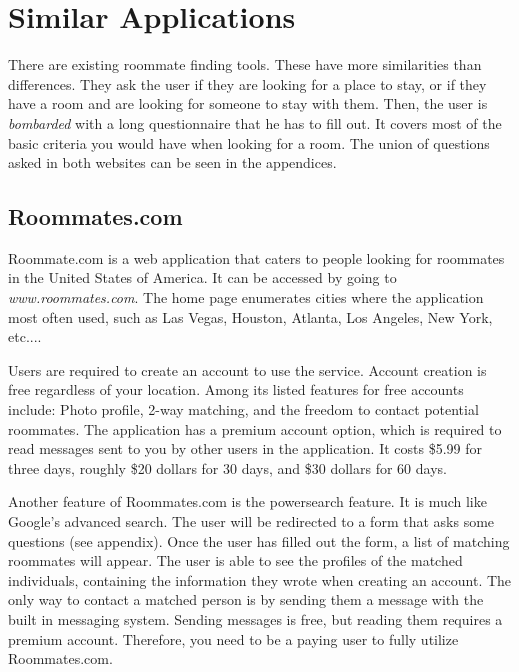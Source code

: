 \documentclass[journal]{./IEEE/IEEEtran}
\begin{document}
\section{Similar Applications}
There are existing roommate finding tools. These have more similarities than differences. They ask the user if they are looking for a place to stay, or if they have a room and are looking for someone to stay with them. Then, the user is \textit{bombarded} with a long questionnaire that he has to fill out. It covers most of the basic criteria you would have when looking for a room. The union of questions asked in both websites can be seen in the appendices.

\subsection{Roommates.com}
Roommate.com\cite{roommates.com} is a web application that caters to people looking for roommates in the United States of America. It can be accessed by going to \textit{www.roommates.com}. The home page enumerates cities where the application most often used, such as Las Vegas, Houston, Atlanta, Los Angeles, New York, etc....

Users are required to create an account to use the service. Account creation is free regardless of your location. Among its listed features for free accounts include: Photo profile, 2-way matching, and the freedom to contact potential roommates. The application has a premium account option, which is required to read messages sent to you by other users in the application. It costs \$5.99 for three days, roughly \$20 dollars for 30 days, and \$30 dollars for 60 days.

Another feature of Roommates.com is the powersearch feature. It is much like Google's advanced search. The user will be redirected to a form that asks some questions (see appendix). Once the user has filled out the form, a list of matching roommates will appear. The user is able to see the profiles of the matched individuals, containing the information they wrote when creating an account. The only way to contact a matched person is by sending them a message with the built in messaging system. Sending messages is free, but reading them requires a premium account. Therefore, you need to be a paying user to fully utilize Roommates.com.
\end{document}
